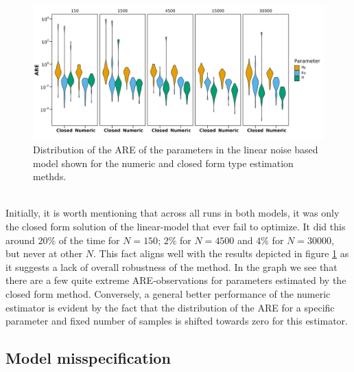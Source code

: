 \begin{figure}[h!]
\begin{center}
    \includegraphics[scale = .1]{figures/ARE_dist_result_plot_Linear.jpeg}
    \caption{Distribution of the ARE of the parameters in the linear noise based model shown for the numeric and closed form type estimation methds.}
    \label{figure:ARE_dist_linear_noise}
\end{center}
\end{figure}\\
Initially, it is worth mentioning that across all runs in both models, it was only the closed form solution of the linear-model that ever fail to optimize. It did this around $20\%$ of the time for $N = 150$; $2\%$ for $N = 4500$ and $4\%$ for $N = 30000$, but never at other $N$. This fact aligns well with the results depicted in figure \ref{figure:ARE_dist_linear_noise} as it suggests a lack of overall robustness of the method. In the graph we see that there are a few quite extreme ARE-observations for parameters estimated by the closed form method. Conversely, a general better performance of the numeric estimator is evident by the fact that the distribution of the ARE for a specific parameter and fixed number of samples is shifted towards zero for this estimator.  
\subsection{Model misspecification}

